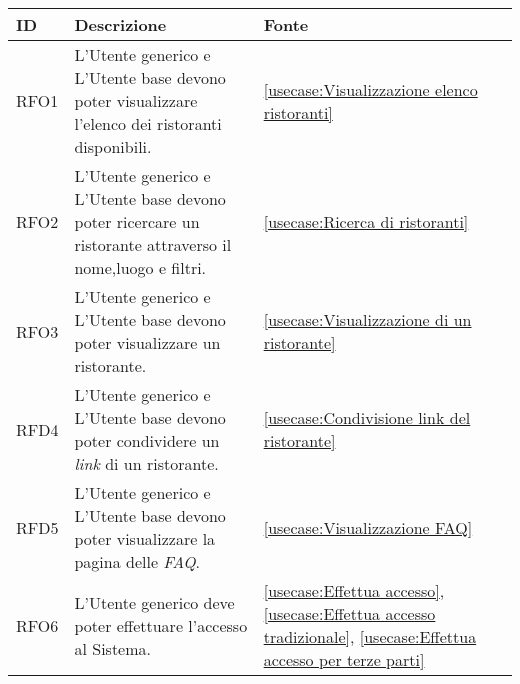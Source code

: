 \begin{table}[H]
	\renewcommand{\arraystretch}{1.5}
	\centering
	\begin{tabularx}{\textwidth}{l|X|p{2cm}}
		\textbf{ID} & \textbf{Descrizione}                                                                                       & \textbf{Fonte}                                                                                                                                               \\
		\hline
		RFO1        & L'Utente generico e L'Utente base devono poter visualizzare l'elenco dei ristoranti disponibili.                             & \autoref{usecase:Visualizzazione elenco ristoranti}                                                                                                          \\
		\hline
		RFO2        & L'Utente generico e L'Utente base devono poter ricercare un ristorante attraverso il nome,luogo e filtri.                    & \autoref{usecase:Ricerca di ristoranti}                                                                                                                      \\
		\hline
		RFO3        & L'Utente generico e L'Utente base devono poter visualizzare un ristorante.                                                   & \autoref{usecase:Visualizzazione di un ristorante}                                                                                                           \\
		\hline
		RFD4        & L'Utente generico e L'Utente base devono poter condividere un \textit{link} di un ristorante.                                         & \autoref{usecase:Condivisione link del ristorante}                                                                                                           \\
		\hline
		RFD5        & L'Utente generico e L'Utente base devono poter visualizzare la pagina delle  \textit{\ac{FAQ}}.                                             & \autoref{usecase:Visualizzazione FAQ}                                                                                                                        \\
		\hline
		RFO6        & L'Utente generico deve poter effettuare l'accesso al Sistema.                                              & \autoref{usecase:Effettua accesso}, \autoref{usecase:Effettua accesso tradizionale}, \autoref{usecase:Effettua accesso per terze parti}                      \\

\end{tabularx}
\end{table}
